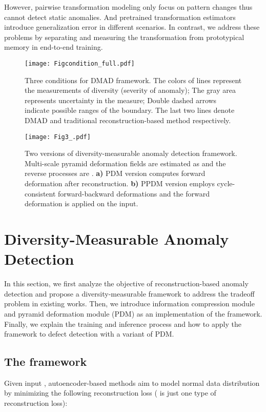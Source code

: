 \documentclass[10pt,twocolumn,letterpaper]{article}
\begin{document}
    However, pairwise transformation modeling only focus on pattern changes thus cannot detect static anomalies. And pretrained transformation estimators introduce generalization error in different scenarios. In contrast, we address these problems by separating and measuring the transformation from prototypical memory in end-to-end training.
    
    \begin{figure}
  \centering
  \texttt{[image: Figcondition\_full.pdf]}
  \vspace{-1.em}
  \caption{Three conditions for DMAD framework. The colors of lines represent the measurements of diversity (severity of anomaly); The gray area represents uncertainty in the measure; Double dashed arrows indicate possible ranges of the boundary. The last two lines denote  DMAD and traditional reconstruction-based method respectively.}
  \vspace{-0.1em}
  \label{fig:cond}
\end{figure}

\begin{figure*}
  \centering
  \texttt{[image: Fig3\_.pdf]}
  \vspace{-0.3em}
  \caption{Two versions of diversity-measurable anomaly detection framework. Multi-scale pyramid deformation fields are estimated as  and the reverse processes are . \textbf{a)} PDM version computes forward deformation  after reconstruction. \textbf{b)} PPDM version employs cycle-consistent forward-backward deformations and the forward deformation is applied on the input.
 }
  \vspace{-0.1em}
  \label{fig:3}
\end{figure*}

\section{Diversity-Measurable Anomaly Detection}
    In this section, we first analyze the objective of reconstruction-based anomaly detection and propose a diversity-measurable framework to address the tradeoff problem in existing works. Then, we introduce information compression module and pyramid deformation module (PDM) as an implementation of the framework. Finally, we explain the training and inference process and how to apply the framework to defect detection with a variant of PDM.
   
    \subsection{The framework}
        \label{framework}
        Given input , autoencoder-based methods aim to model normal data distribution by minimizing the following reconstruction loss ( is just one type of reconstruction loss):
        
\end{document}
